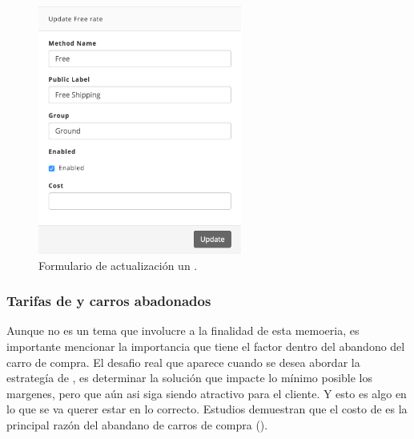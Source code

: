 \begin{figure}[H]
	\centering
	\includegraphics[width=0.6\textwidth]{figuras/dashboard/shipping/form_shipping_update.png}
	\caption{Formulario de actualización un \shippingEF.}
	\label{figure:dashboard:shipping:form_shipping_update}
\end{figure}


\subsubsection{Tarifas de \shippingEF y carros abadonados}

Aunque no es un tema que involucre a la finalidad de esta memoeria, es importante mencionar la importancia que tiene el factor \shippingEF dentro del abandono del carro de compra.
El desafio real que aparece cuando se desea abordar la estrategía de \shippingEF, es determinar la solución que impacte lo mínimo posible los margenes, pero que aún asi siga siendo atractivo para el cliente.
Y esto es algo en lo que se va querer estar en lo correcto. Estudios demuestran que el costo de \shippingEF es la principal razón del abandano de carros de compra ()\cite{online_forrester_consulting_smarter_stratefie_free_shipping}.


